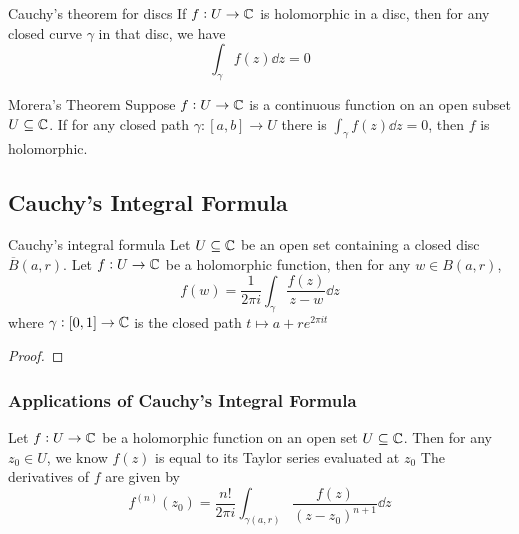 \documentclass{styles/tufte}
\begin{document}
  \begin{theorem}{Cauchy's theorem for discs}{}
    If $f: U \to \mathbb{C}$ is holomorphic in a disc, then for any closed curve $\gamma$ in that disc, we have
    \[ \int_\gamma f(z) \dd{z} = 0 \]
  \end{theorem}

\begin{theorem}{Morera's Theorem}{}
  Suppose $f: U \to \mathbb{C}$ is a continuous function on an open subset $U \subseteq \mathbb{C}$. If for any closed path $\gamma: [a, b] \to U$ there is $\int_\gamma f(z) \dd{z} = 0$, then $f$ is holomorphic.
\end{theorem}


\subsection{Cauchy's Integral Formula}

  \begin{theorem}{Cauchy's integral formula}{}
    Let $U \subseteq \mathbb{C}$ be an open set containing a closed disc $\overline{B}(a, r)$. Let $f: U \to \mathbb{C}$ be a holomorphic function, then for any $w \in B(a, r)$,
    \[ f(w) = \frac{1}{2\pi i} \int_\gamma \frac{f(z)}{z - w} \dd{z} \]
    where $\gamma: [0, 1] \to \mathbb{C}$ is the closed path $t \mapsto a + re^{2\pi it}$
  \end{theorem}
  \begin{proof}
    
  \end{proof}
  
  \subsubsection{Applications of Cauchy's Integral Formula}
  
    \begin{theorem}{}{}
      Let $f: U \to \mathbb{C}$ be a holomorphic function on an open set $U \subseteq \mathbb{C}$. Then for any $z_0 \in U$, we know $f(z)$ is equal to its Taylor series evaluated at $z_0$
      The derivatives of $f$ are given by
      \[ f^{(n)}(z_0) = \frac{n!}{2\pi i} \int_{\gamma(a, r)} \frac{f(z)}{(z - z_0)^{n+1}} \dd{z} \]
    \end{theorem}
    
\end{document}
